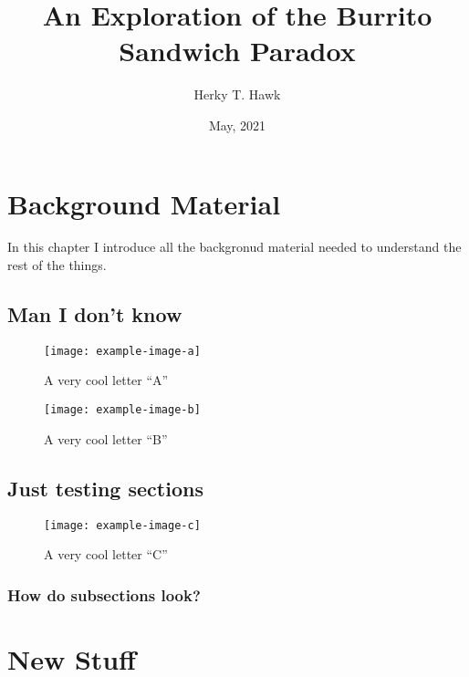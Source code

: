 \documentclass[letterpaper, openany, 12pt, oneside]{uithesis}
\title{An Exploration of the Burrito Sandwich Paradox}
\author{Herky T. Hawk}
\date{May, 2021}
\begin{document}
\titlepage

\copyrightPage

\frontmatter

\begin{publicAbstract}
	\lipsum[1-2]
\end{publicAbstract}

\begin{abstract}
	\lipsum[1-2]
\end{abstract}

\tableofcontents*

\listoffigures

\listoftables

\mainmatter

\chapter{Background Material}

In this chapter I introduce all the backgronud material needed to understand the
rest of the things.

\section{Man I don't know}
\begin{figure}
	\centering
	\label{fig:one}
	\caption{A very cool letter ``A''}
	\texttt{[image: example-image-a]}
\end{figure}
\lipsum[1-5]
\begin{figure}
	\centering
	\label{fig:two}
	\caption{A very cool letter ``B''}
	\texttt{[image: example-image-b]}
\end{figure}
\lipsum[6-10]

\section{Just testing sections}
\begin{figure}[!htb]
	\centering
	\label{fig:three}
	\caption{A very cool letter ``C''}
	\texttt{[image: example-image-c]}
\end{figure}
\lipsum[11-15]

\subsection{How do subsections look?}
\lipsum[75]


\chapter{New Stuff}
\lipsum[21-40]
\end{document}
